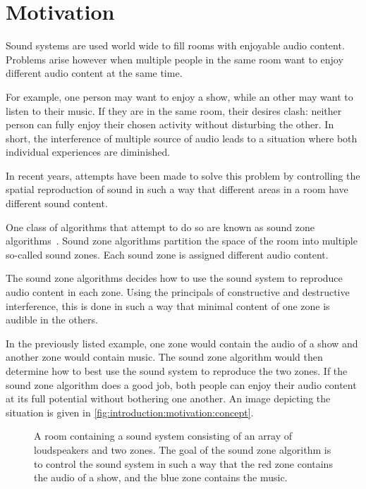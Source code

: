 \section{Motivation}
\label{ch:introduction:motivation}
Sound systems are used world wide to fill rooms with enjoyable audio content. 
Problems arise however when multiple people in the same room want to enjoy different audio content at the same time.

For example, one person may want to enjoy a show, while an other may want to listen to their music.
If they are in the same room, their desires clash: neither person can fully enjoy their chosen activity without disturbing
the other.
In short, the interference of multiple source of audio leads to a situation where both individual experiences are diminished.

In recent years, attempts have been made to solve this problem by controlling the spatial reproduction of sound in such
a way that different areas in a room have different sound content.

One class of algorithms that attempt to do so are known as sound zone algorithms~\cite{betlehem2015personal}.
Sound zone algorithms partition the space of the room into multiple so-called sound zones.
Each sound zone is assigned different audio content.

The sound zone algorithms decides how to use the sound system to reproduce audio content in each zone.
Using the principals of constructive and destructive interference, this is done in such a way that minimal 
content of one zone is audible in the others.

In the previously listed example, one zone would contain the audio of a show and another zone would contain music.
The sound zone algorithm would then determine how to best use the sound system to reproduce the two zones.
If the sound zone algorithm does a good job, both people can enjoy their audio content at its full potential 
without bothering one another.
An image depicting the situation is given in \autoref{fig:introduction:motivation:concept}.

\begin{figure}[t]
    \centering
    \scalebox{1.0}{}
    \caption{A room containing a sound system consisting of an array of loudspeakers and two zones.
                The goal of the sound zone algorithm is to control the sound system in such a way that the red zone
                contains the audio of a show, and the blue zone contains the music.}
    \label{fig:introduction:motivation:concept}
\end{figure}

